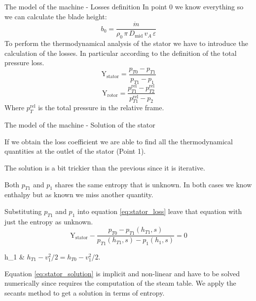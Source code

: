\documentclass{beamer}
\newcommand{\myspaceneg}[0]{\vspace{-0.15cm}}
\newcommand{\dmid}{D_\text{mid}}
\begin{document}
\begin{frame}[t]{The model of the machine - Losses definition}
In point 0 we know everything so we can calculate the blade height:
\myspaceneg
\begin{equation}
b_0 = \dfrac{\dot{m}}{\rho_0 \, \pi \, \dmid \, v_A \, \varepsilon}
\end{equation}
To perform the thermodynamical analysis of the stator we have to introduce the calculation of the losses. In particular according to the definition of the total pressure loss.
\myspaceneg
\begin{equation}
\label{eq:stator_loss}
\text{Y}_\text{stator} =  \dfrac{p_{T0} - p_{T1}}{p_{T1} - p_1}
\end{equation}
\myspaceneg
\begin{equation}
\label{eq:rotor_loss}
\text{Y}_\text{rotor} =  \dfrac{p_{T1}^{\text{rel}} - p_{T2}^{\text{rel}}}{p_{T1}^{\text{rel}} - p_2}
\end{equation}
Where $p_T^{\text{rel}}$ is the total pressure in the relative frame.
\end{frame}


\begin{frame}[t]{The model of the machine - Solution of the stator}

If we obtain the loss coefficient we are able to find all the thermodynamical quantities at the outlet of the stator (Point 1).

The solution is a bit trickier than the previous since it is iterative. 

Both $p_{T1}$ and $p_1$ shares the same entropy that is unknown. In both cases we know enthalpy but as known we miss another quantity.

Substituting $p_{T1}$ and $p_1$ into equation \ref{eq:stator_loss} leave that equation with just the entropy as unknown.
\myspaceneg
\myspaceneg
\begin{equation}
\label{eq:stator_solution}
\text{Y}_\text{stator} - \dfrac{p_{T0} - p_{T1}(h_{T1}, s)}{p_{T1}(h_{T1}, s) - p_1(h_{1}, s)} = 0
\end{equation}
\myspaceneg
\begin{conditions}
h_{1} & $h_{T1} - v_1^2 / 2 = h_{T0} - v_1^2 / 2$.
\end{conditions}
\myspaceneg
Equation \ref{eq:stator_solution} is implicit and non-linear and have to be solved numerically since requires the computation of the steam table. We apply the secants method to get a solution in terms of entropy.
\end{frame}
\end{document}
